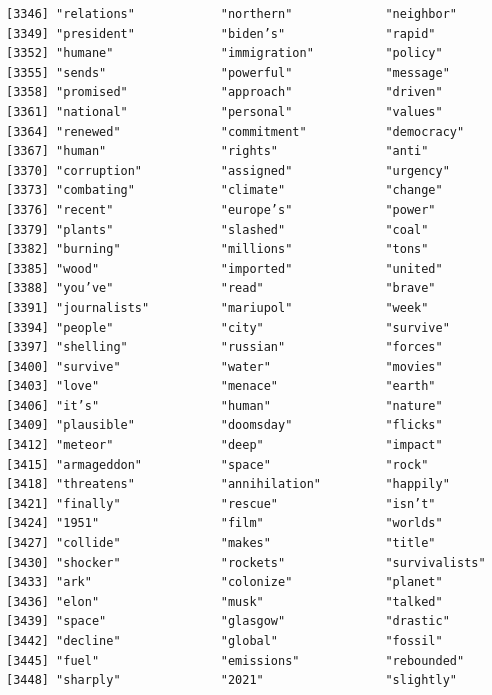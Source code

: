 \documentclass[
  letterpaper,
  DIV=11,
  numbers=noendperiod]{scrartcl}
\begin{document}
\begin{verbatim}
[3346] "relations"            "northern"             "neighbor"            
[3349] "president"            "biden’s"              "rapid"               
[3352] "humane"               "immigration"          "policy"              
[3355] "sends"                "powerful"             "message"             
[3358] "promised"             "approach"             "driven"              
[3361] "national"             "personal"             "values"              
[3364] "renewed"              "commitment"           "democracy"           
[3367] "human"                "rights"               "anti"                
[3370] "corruption"           "assigned"             "urgency"             
[3373] "combating"            "climate"              "change"              
[3376] "recent"               "europe’s"             "power"               
[3379] "plants"               "slashed"              "coal"                
[3382] "burning"              "millions"             "tons"                
[3385] "wood"                 "imported"             "united"              
[3388] "you’ve"               "read"                 "brave"               
[3391] "journalists"          "mariupol"             "week"                
[3394] "people"               "city"                 "survive"             
[3397] "shelling"             "russian"              "forces"              
[3400] "survive"              "water"                "movies"              
[3403] "love"                 "menace"               "earth"               
[3406] "it’s"                 "human"                "nature"              
[3409] "plausible"            "doomsday"             "flicks"              
[3412] "meteor"               "deep"                 "impact"              
[3415] "armageddon"           "space"                "rock"                
[3418] "threatens"            "annihilation"         "happily"             
[3421] "finally"              "rescue"               "isn’t"               
[3424] "1951"                 "film"                 "worlds"              
[3427] "collide"              "makes"                "title"               
[3430] "shocker"              "rockets"              "survivalists"        
[3433] "ark"                  "colonize"             "planet"              
[3436] "elon"                 "musk"                 "talked"              
[3439] "space"                "glasgow"              "drastic"             
[3442] "decline"              "global"               "fossil"              
[3445] "fuel"                 "emissions"            "rebounded"           
[3448] "sharply"              "2021"                 "slightly"            

\end{verbatim}
\end{document}
